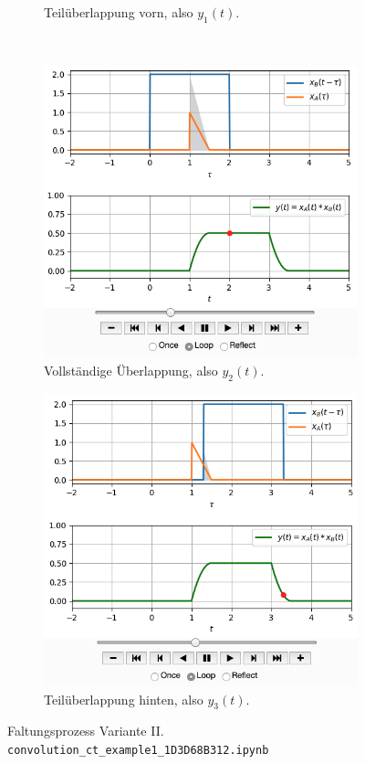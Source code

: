 \begin{figure}[h!]
\begin{subfigure}{0.45\textwidth}
\caption{Teilüberlappung vorn, also $y_1(t)$.}
\label{fig:1D3D68B312_v2_1}
\end{subfigure}
\\
\begin{subfigure}{0.45\textwidth}
\centering
\includegraphics[width=\textwidth]{../convolution_ct/conv_var2_2_1D3D68B312.png}
\caption{Vollständige Überlappung, also $y_2(t)$.}
\label{fig:1D3D68B312_v2_2}
\end{subfigure}
\begin{subfigure}{0.45\textwidth}
\centering
\includegraphics[width=\textwidth]{../convolution_ct/conv_var2_3_1D3D68B312.png}
\caption{Teilüberlappung hinten, also $y_3(t)$.}
\label{fig:1D3D68B312_v2_3}
\end{subfigure}
%
\caption{Faltungsprozess Variante II.
\texttt{convolution\_ct\_example1\_1D3D68B312.ipynb}}
\label{fig:1D3D68B312_v2}
\end{figure}


